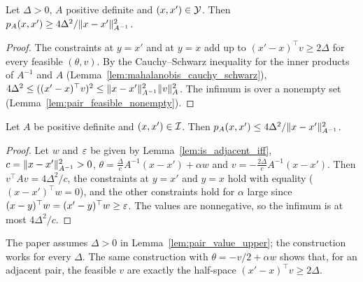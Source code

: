 \begin{lemma}
  \label{lem:pair_value_lower}
  \leanok
  Let $\Delta > 0$, $A$ positive definite and $(x, x') \in \mathcal{Y}$. Then
  $p_A(x, x') \ge 4\Delta^2 / \lVert x - x' \rVert^2_{A^{-1}}$.
\end{lemma}

\begin{proof}
  \leanok
  The constraints at $y = x'$ and at $y = x$ add up to $(x' - x)^\top v \ge 2\Delta$ for every
  feasible $(\theta, v)$. By the Cauchy--Schwarz inequality for the inner products of $A^{-1}$ and
  $A$ (Lemma~\ref{lem:mahalanobis_cauchy_schwarz}),
  $4 \Delta^2 \le ((x' - x)^\top v)^2 \le \lVert x - x' \rVert^2_{A^{-1}} \lVert v \rVert^2_A$. The infimum is
  over a nonempty set (Lemma~\ref{lem:pair_feasible_nonempty}).
\end{proof}

\begin{lemma}
  \label{lem:pair_value_upper}
  \leanok
  Let $A$ be positive definite and $(x, x') \in \mathcal{I}$. Then
  $p_A(x, x') \le 4\Delta^2 / \lVert x - x' \rVert^2_{A^{-1}}$.
\end{lemma}

\begin{proof}
  \leanok
  Let $w$ and $\varepsilon$ be given by Lemma~\ref{lem:is_adjacent_iff}, $c = \lVert x - x' \rVert^2_{A^{-1}} > 0$,
  $\theta = \frac{\Delta}{c} A^{-1}(x - x') + \alpha w$ and $v = -\frac{2\Delta}{c} A^{-1}(x - x')$.
  Then $v^\top A v = 4\Delta^2 / c$, the constraints at $y = x'$ and $y = x$ hold with equality
  ($(x - x')^\top w = 0$), and the other constraints hold for $\alpha$ large since
  $(x - y)^\top w = (x' - y)^\top w \ge \varepsilon$. The values are nonnegative, so the infimum is at most
  $4\Delta^2 / c$.
\end{proof}

\begin{remark}
  The paper assumes $\Delta > 0$ in Lemma~\ref{lem:pair_value_upper}; the construction works for
  every $\Delta$. The same construction with $\theta = -v/2 + \alpha w$ shows that, for an adjacent
  pair, the feasible $v$ are exactly the half-space $(x' - x)^\top v \ge 2\Delta$.
\end{remark}

